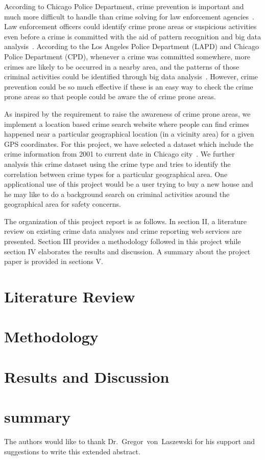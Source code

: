 According to Chicago Police Department, crime prevention is important and much 
more difficult to handle than crime solving for law enforcement 
agencies~\cite{hid-sp18-409-www-cpd}. Law enforcement officers could identify 
crime prone areas or suspicious activities 
even before a crime is committed with the aid of pattern recognition and 
big data analysis~\cite{hid-sp18-409-nath2006crime, hid-sp18-409-gera2014city}. 
According to the Los Angeles Police Department (LAPD) and 
Chicago Police Department (CPD), whenever a crime was committed somewhere, more 
crimes are likely to be occurred in a nearby area, and the patterns of those 
criminal activities could be identified through big data 
analysis~\cite{hid-sp18-409-www-cpd, hid-sp18-409-www-lapd}. However, 
crime prevention could be so much effective if these is an easy way to check 
the crime prone areas so that people could be aware the of crime prone 
areas.

As inspired by the requirement to raise the awareness of crime prone areas, we 
implement a location based crime search website where people can find 
crimes happened near a particular geographical location (in a vicinity area) 
for a given GPS coordinates. For this project, we have selected a dataset which 
include the crime information from 2001 to current date in Chicago 
city~\cite{hid-sp18-409-www-data.gov}. We further analysis this crime dataset 
using the crime type and tries to identify the correlation between crime 
types for a particular geographical area. One applicational use of this project 
would be a user trying to buy a new house and he may like to do a background 
search on criminal activities around the geographical area for safety concerns.

The organization of this project report is as follows. In section II, a 
literature review on existing crime data analyses and crime reporting web 
services are presented. Section III provides a methodology followed in this 
project while section IV elaborates the results and discussion. A summary about 
the project paper is provided in sections V.

\section{Literature Review}

\section{Methodology}

\section{Results and Discussion}

\section{summary} 

\begin{acks}
	
	The authors would like to thank Dr.~Gregor~von~Laszewski for his support and
	suggestions to write this extended abstract.
	
\end{acks}


 